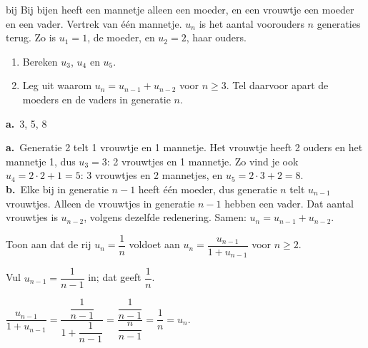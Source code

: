 \begin{oefeningen}
\begin{oefening}[3]
\begin{metprent}{bij}
Bij bijen heeft een mannetje alleen een moeder, en een vrouwtje een moeder en een vader. Vertrek van één mannetje. $u_n$ is het aantal voorouders $n$ generaties terug. Zo is $u_1 = 1$, de moeder, en $u_2 = 2$, haar ouders.
\begin{enumerate}
  \item Bereken $u_3$, $u_4$ en $u_5$.
  \item Leg uit waarom $u_n = u_{n-1} + u_{n-2}$ voor $n \geqslant 3$. Tel daarvoor apart de moeders en de vaders in generatie $n$.
\end{enumerate}
\end{metprent}
\begin{solution}
\textbf{a.}~3, 5, 8
\end{solution}
\begin{fullsolution}
\textbf{a.}~Generatie 2 telt 1 vrouwtje en 1 mannetje. Het vrouwtje heeft 2 ouders en het mannetje 1, dus $u_3=3$: 2 vrouwtjes en 1 mannetje. Zo vind je ook $u_4=2\cdot 2+1=5$: 3 vrouwtjes en 2 mannetjes, en $u_5=2\cdot 3+2=8$.\\
\textbf{b.}~Elke bij in generatie $n-1$ heeft één moeder, dus generatie $n$ telt $u_{n-1}$ vrouwtjes. Alleen de vrouwtjes in generatie $n-1$ hebben een vader. Dat aantal vrouwtjes is $u_{n-2}$, volgens dezelfde redenering. Samen: $u_n=u_{n-1}+u_{n-2}$.
\end{fullsolution}
\end{oefening}

\begin{oefening}[3]
Toon aan dat de rij $u_n = \dfrac{1}{n}$ voldoet aan $u_n = \dfrac{u_{n-1}}{1 + u_{n-1}}$ voor $n \geqslant 2$.
\begin{solution}
Vul $u_{n-1}=\dfrac{1}{n-1}$ in; dat geeft $\dfrac1n$.
\end{solution}
\begin{fullsolution}
$\dfrac{u_{n-1}}{1+u_{n-1}}=\dfrac{\dfrac{1}{n-1}}{1+\dfrac{1}{n-1}}=\dfrac{\dfrac{1}{n-1}}{\dfrac{n}{n-1}}=\dfrac{1}{n}=u_n$.
\end{fullsolution}
\end{oefening}


\end{oefeningen}
